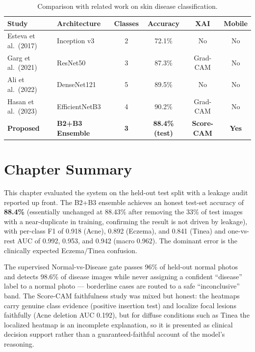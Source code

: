 \begin{table}[H]
\centering
\caption{Comparison with related work on skin disease classification.}
\label{tab:related_comparison}
\begin{tabular}{|p{3.5cm}|p{2.5cm}|c|c|c|c|}
\hline
\textbf{Study} & \textbf{Architecture} & \textbf{Classes} & \textbf{Accuracy} & \textbf{XAI} & \textbf{Mobile} \\ \hline
Esteva et al.\ (2017) & Inception v3 & 2 & 72.1\% & No & No \\ \hline
Garg et al.\ (2021) & ResNet50 & 3 & 87.3\% & Grad-CAM & No \\ \hline
Ali et al.\ (2022) & DenseNet121 & 5 & 89.5\% & No & No \\ \hline
Hasan et al.\ (2023) & EfficientNetB3 & 4 & 90.2\% & Grad-CAM & No \\ \hline
\textbf{Proposed} & \textbf{B2+B3 Ensemble} & \textbf{3} & \textbf{88.4\% (test)} & \textbf{Score-CAM} & \textbf{Yes} \\ \hline
\end{tabular}
\end{table}


\section{Chapter Summary}

This chapter evaluated the system on the held-out test split with a leakage audit
reported up front. The B2+B3 ensemble achieves an honest test-set accuracy of
\textbf{88.4\%} (essentially unchanged at 88.43\% after removing the 33\% of test
images with a near-duplicate in training, confirming the result is not driven by
leakage), with per-class F1 of 0.918 (Acne), 0.892 (Eczema), and 0.841 (Tinea)
and one-vs-rest AUC of 0.992, 0.953, and 0.942 (macro 0.962). The dominant error
is the clinically expected Eczema/Tinea confusion.

The supervised Normal-vs-Disease gate passes 96\% of held-out normal photos and
detects 98.6\% of disease images while never assigning a confident ``disease''
label to a normal photo — borderline cases are routed to a safe ``inconclusive''
band. The Score-CAM faithfulness study was mixed but honest: the heatmaps carry
genuine class evidence (positive insertion test) and localize focal lesions
faithfully (Acne deletion AUC 0.192), but for diffuse conditions such as Tinea
the localized heatmap is an incomplete explanation, so it is presented as
clinical decision support rather than a guaranteed-faithful account of the
model's reasoning.

